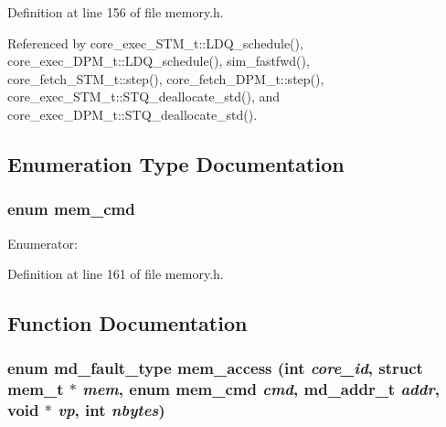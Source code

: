 Definition at line 156 of file memory.h.

Referenced by core\_\-exec\_\-STM\_\-t::LDQ\_\-schedule(), core\_\-exec\_\-DPM\_\-t::LDQ\_\-schedule(), sim\_\-fastfwd(), core\_\-fetch\_\-STM\_\-t::step(), core\_\-fetch\_\-DPM\_\-t::step(), core\_\-exec\_\-STM\_\-t::STQ\_\-deallocate\_\-std(), and core\_\-exec\_\-DPM\_\-t::STQ\_\-deallocate\_\-std().

\subsection{Enumeration Type Documentation}
\subsubsection[{mem\_\-cmd}]{\setlength{\rightskip}{0pt plus 5cm}enum {\bf mem\_\-cmd}}\label{memory_8h_19bf2c6deec285a5faced04c2a2f4b80}


\begin{Desc}
\item[Enumerator: ]\par
\begin{description}
\item[{\em 
Read\label{memory_8h_19bf2c6deec285a5faced04c2a2f4b80809abe96853e69894bbf8e5730b31348}
}]\item[{\em 
Write\label{memory_8h_19bf2c6deec285a5faced04c2a2f4b80a56670174817e3fed92bfd8182d7c0d1}
}]\end{description}
\end{Desc}



Definition at line 161 of file memory.h.

\subsection{Function Documentation}
\subsubsection[{mem\_\-access}]{\setlength{\rightskip}{0pt plus 5cm}enum {\bf md\_\-fault\_\-type} mem\_\-access (int {\em core\_\-id}, \/  struct {\bf mem\_\-t} $\ast$ {\em mem}, \/  enum {\bf mem\_\-cmd} {\em cmd}, \/  {\bf md\_\-addr\_\-t} {\em addr}, \/  void $\ast$ {\em vp}, \/  int {\em nbytes})}\label{memory_8h_2b4368bb43fd552750bdf3f6e59b7c46}




